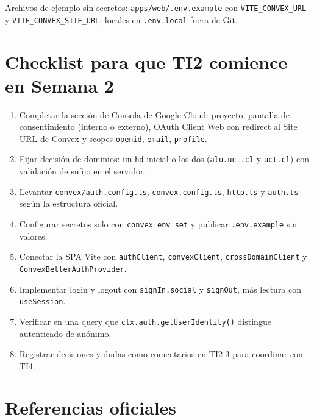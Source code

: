 \documentclass[11pt,a4paper]{article}
\begin{document}
Archivos de ejemplo sin secretos: \texttt{apps/web/.env.example} con
\texttt{VITE\_CONVEX\_URL} y \texttt{VITE\_CONVEX\_SITE\_URL}; locales en
\texttt{.env.local} fuera de Git.

\section{Checklist para que TI2 comience en Semana 2}

\begin{enumerate}
  \item Completar la sección de Consola de Google Cloud: proyecto, pantalla de
    consentimiento (interno o externo), OAuth Client Web con redirect al Site
    URL de Convex y scopes \texttt{openid}, \texttt{email}, \texttt{profile}.
  \item Fijar decisión de dominios: un \texttt{hd} inicial o los dos
    (\texttt{alu.uct.cl} y \texttt{uct.cl}) con validación de sufijo en el
    servidor.
  \item Levantar \texttt{convex/auth.config.ts}, \texttt{convex.config.ts},
    \texttt{http.ts} y \texttt{auth.ts} según la estructura oficial.
  \item Configurar secretos solo con \texttt{convex env set} y publicar
    \texttt{.env.example} sin valores.
  \item Conectar la SPA Vite con \texttt{authClient}, \texttt{convexClient},
    \texttt{crossDomainClient} y \texttt{ConvexBetterAuthProvider}.
  \item Implementar login y logout con \texttt{signIn.social} y
    \texttt{signOut}, más lectura con \texttt{useSession}.
  \item Verificar en una query que \texttt{ctx.auth.getUserIdentity()} distingue
    autenticado de anónimo.
  \item Registrar decisiones y dudas como comentarios en TI2-3 para coordinar
    con TI4.
\end{enumerate}

\section{Referencias oficiales}
\end{document}

